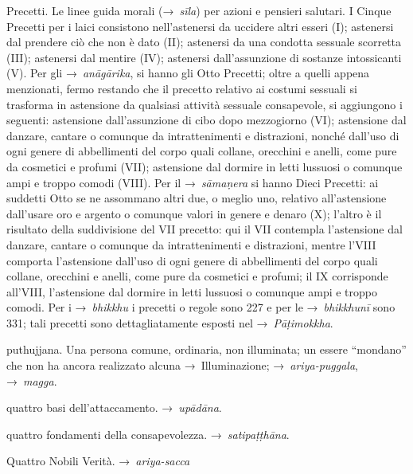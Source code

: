 \begin{glossarydescription}
\item[Precetti.]\label{glossary-precetti} Le linee guida morali (→~\emph{sīla}) per azioni e pensieri
  salutari. I Cinque Precetti per i laici consistono nell'astenersi da uccidere
  altri esseri (I); astenersi dal prendere ciò che non è dato (II); astenersi da
  una condotta sessuale scorretta (III); astenersi dal mentire (IV); astenersi
  dall'assunzione di sostanze intossicanti (V). Per gli →~\emph{anāgārika}, si
  hanno gli Otto Precetti; oltre a quelli appena menzionati, fermo restando che
  il precetto relativo ai costumi sessuali si trasforma in astensione da
  qualsiasi attività sessuale consapevole, si aggiungono i seguenti: astensione
  dall'assunzione di cibo dopo mezzogiorno (VI); astensione dal danzare, cantare
  o comunque da intrattenimenti e distrazioni, nonché dall'uso di ogni genere di
  abbellimenti del corpo quali collane, orecchini e anelli, come pure da
  cosmetici e profumi (VII); astensione dal dormire in letti lussuosi o comunque
  ampi e troppo comodi (VIII). Per il →~\emph{sāmaṇera} si hanno Dieci Precetti:
  ai suddetti Otto se ne assommano altri due, o meglio uno, relativo
  all'astensione dall'usare oro e argento o comunque valori in genere e denaro
  (X); l'altro è il risultato della suddivisione del VII precetto: qui il VII
  contempla l'astensione dal danzare, cantare o comunque da intrattenimenti e
  distrazioni, mentre l'VIII comporta l'astensione dall'uso di ogni genere di
  abbellimenti del corpo quali collane, orecchini e anelli, come pure da
  cosmetici e profumi; il IX corrisponde all'VIII, l'astensione dal dormire in
  letti lussuosi o comunque ampi e troppo comodi. Per i →~\emph{bhikkhu} i
  precetti o regole sono 227 e per le →~\emph{bhikkhunī} sono 331; tali precetti
  sono dettagliatamente esposti nel →~\emph{Pāṭimokkha}.

\item[puthujjana.] Una persona comune, ordinaria, non illuminata; un
  essere ``mondano'' che non ha ancora realizzato alcuna →~Illuminazione;
  →~\emph{ariya-puggala}, →~\emph{magga}.


\item[quattro basi dell'attaccamento.] →~\emph{upādāna}.

\item[quattro fondamenti della consapevolezza.] →~\emph{satipaṭṭhāna}.

\item[Quattro Nobili Verità.] →~\emph{ariya-sacca}


\end{glossarydescription}
